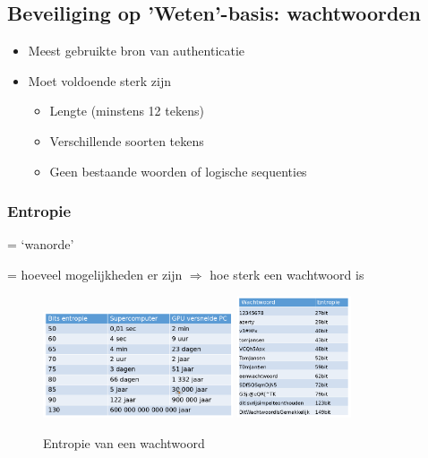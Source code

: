 \documentclass{article}
\begin{document}
\subsection{Beveiliging op 'Weten'-basis: wachtwoorden}

\begin{itemize}
    \item Meest gebruikte bron van authenticatie
    \item Moet voldoende sterk zijn
    \begin{itemize}
        \item Lengte (minstens 12 tekens)
        \item Verschillende soorten tekens
        \item Geen bestaande woorden of logische sequenties
    \end{itemize}
\end{itemize}

\subsubsection{Entropie}

= `wanorde'

= hoeveel mogelijkheden er zijn $\Rightarrow$ hoe sterk een wachtwoord is

\begin{figure}[H]
    \centering
    \includegraphics[width=0.5\textwidth]{wachtwoord-entropie.png}
    \includegraphics[width=0.3\textwidth]{wachtwoord-entropie2.png}
    \caption{Entropie van een wachtwoord}
\end{figure}
\end{document}
